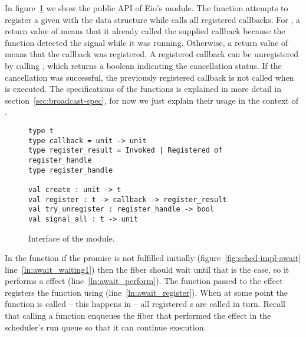 In figure~\ref{fig:sched-impl-broadcast} we show the public API of Eio's  module.
The  function attempts to register a given  with the data structure while  calls all registered callbacks.
For , a return value of  means that it already called the supplied callback because the function detected the signal while it was running.
Otherwise, a return value of  means that the callback was registered.
A registered callback can be unregistered by calling , which returns a boolean indicating the cancellation status.
If the cancellation was successful, the previously registered callback is not called when  is executed.
The specifications of the functions is explained in more detail in section~\ref{sec:broadcast-spec}, for now we just explain their usage in the context of .

\begin{figure}[ht]
  \begin{verbatim}
type t
type callback = unit -> unit
type register_result = Invoked | Registered of register_handle
type register_handle

val create : unit -> t
val register : t -> callback -> register_result
val try_unregister : register_handle -> bool
val signal_all : t -> unit
  \end{verbatim}
  \caption{Interface of the  module.}
  \label{fig:sched-impl-broadcast}
\end{figure}

In the  function if the promise is not fulfilled initially (figure~\ref{fig:sched-impl-await} line~\ref{ln:await_waiting1})
then the fiber should wait until that is the case, so it performs a \esuspend{} effect (line~\ref{ln:await_perform}).
The  function passed to the effect registers the  function using  (line~\ref{ln:await_register}).
When at some point the  function is called -- this happens in  -- all registered s are called in turn.
Recall that calling a  function enqueues the fiber that performed the \esuspend{} effect in the scheduler's run queue so that it can continue execution.


